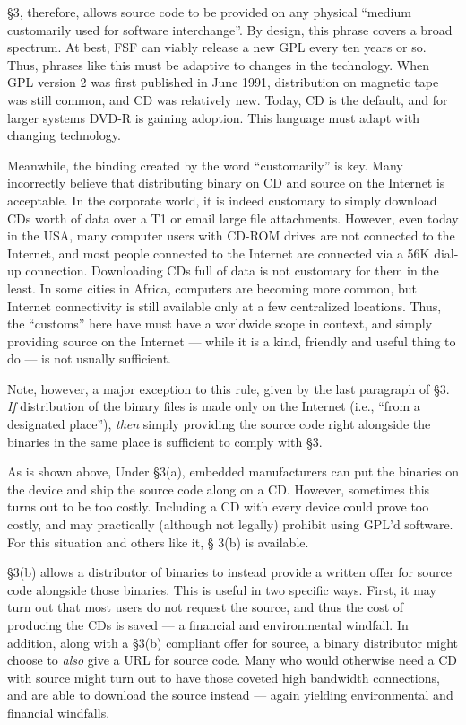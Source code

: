 \documentclass[12pt]{report}
\begin{document}
\S 3, therefore, allows source code to be provided on any physical
``medium customarily used for software interchange''.  By design, this
phrase covers a broad spectrum.  At best, FSF can viably release a new GPL
every ten years or so.  Thus, phrases like this must be adaptive to
changes in the technology.  When GPL version 2 was first published in June
1991, distribution on magnetic tape was still common, and CD was
relatively new.  Today, CD is the default, and for larger systems DVD-R is
gaining adoption.  This language must adapt with changing technology.

Meanwhile, the binding created by the word ``customarily'' is key.  Many
incorrectly believe that distributing binary on CD and source on the
Internet is acceptable.  In the corporate world, it is indeed customary to
simply download CDs worth of data over a T1 or email large file
attachments.  However, even today in the USA, many computer users with
CD-ROM drives are not connected to the Internet, and most people connected
to the Internet are connected via a 56K dial-up connection.  Downloading
CDs full of data is not customary for them in the least.  In some cities
in Africa, computers are becoming more common, but Internet connectivity
is still available only at a few centralized locations.  Thus, the
``customs'' here have must have a worldwide scope in context, and simply
providing source on the Internet --- while it is a kind, friendly and
useful thing to do --- is not usually sufficient.

Note, however, a major exception to this rule, given by the last paragraph
of \S 3.  \emph{If} distribution of the binary files is made only on the
Internet (i.e., ``from a designated place''), \emph{then} simply providing
the source code right alongside the binaries in the same place is
sufficient to comply with \S 3.

\medskip

As is shown above, Under \S 3(a), embedded manufacturers can put the
binaries on the device and ship the source code along on a CD\@.  However,
sometimes this turns out to be too costly.  Including a CD with every
device could prove too costly, and may practically (although not legally)
prohibit using GPL'd software.  For this situation and others like it, \S
3(b) is available.

\S 3(b) allows a distributor of binaries to instead provide a written
offer for source code alongside those binaries.  This is useful in two
specific ways.  First, it may turn out that most users do not request the
source, and thus the cost of producing the CDs is saved --- a financial
and environmental windfall.  In addition, along with a \S 3(b) compliant
offer for source, a binary distributor might choose to \emph{also} give a
URL for source code.  Many who would otherwise need a CD with source might
turn out to have those coveted high bandwidth connections, and are able to
download the source instead --- again yielding environmental and financial
windfalls.
\end{document}
